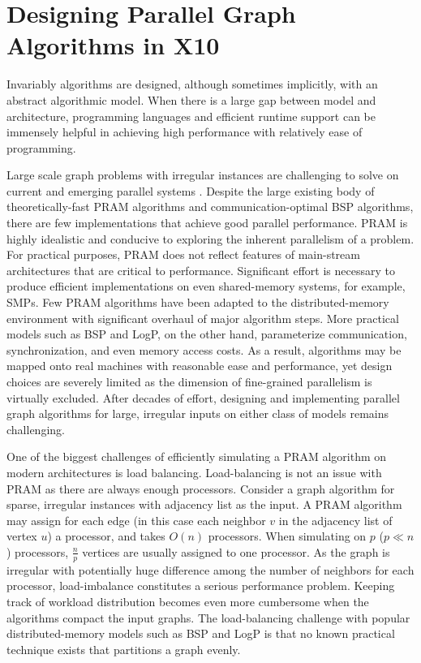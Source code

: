 
\section{Designing Parallel Graph Algorithms in X10}
\label{s:design}

 Invariably algorithms are designed, although sometimes implicitly, with an abstract algorithmic model. 
When there is a large gap between model and architecture, programming languages and efficient runtime support can be immensely helpful in achieving high performance with relatively ease of programming. 

 Large scale graph problems with irregular instances are challenging to solve on current and emerging parallel systems \cite{BC07}. Despite the large existing body of theoretically-fast PRAM algorithms and communication-optimal BSP algorithms, there are few implementations that achieve good parallel performance.
PRAM is highly idealistic and conducive to exploring the inherent parallelism of a problem. For practical purposes, PRAM does not reflect features of main-stream architectures that are critical to performance. Significant effort is necessary to produce efficient implementations on even shared-memory systems, for example, SMPs. Few PRAM algorithms have been adapted to the distributed-memory environment with significant overhaul of major algorithm steps. More practical models such as BSP and LogP, on the other hand, parameterize communication, synchronization, and even memory access costs. As a result, algorithms may be mapped onto real machines with reasonable ease and performance, yet design choices are severely limited as the dimension of fine-grained parallelism is virtually excluded. After decades of effort, designing and implementing parallel graph algorithms for large, irregular inputs on either class of models remains challenging. 

 One of the biggest challenges of efficiently simulating a PRAM algorithm on modern architectures is load balancing. Load-balancing is not an issue with PRAM as there are always enough processors. Consider a graph algorithm for sparse, irregular instances with adjacency list as the input. A PRAM algorithm may assign for each edge (in this case each neighbor $v$ in the adjacency list of vertex $u$) a processor, and takes $O(n)$ processors. When simulating on $p$ ($p\ll n$) processors, $\frac{n}{p}$ vertices are usually assigned to one processor. As the graph is irregular with potentially huge difference among the number of neighbors for each processor, load-imbalance constitutes a serious performance problem. Keeping track of workload distribution becomes even more cumbersome when the algorithms compact the input graphs. The load-balancing challenge with popular distributed-memory models such as BSP and LogP is that no known practical technique exists that partitions a graph evenly.  

